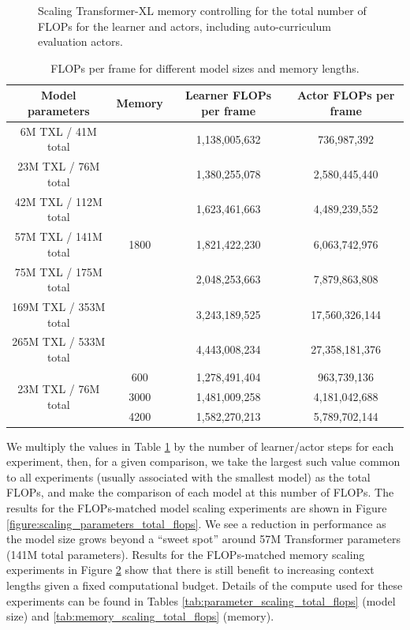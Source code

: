 \documentclass[11pt, a4paper, logo, copyright]{deepmind}
\begin{document}
\begin{appendix}
\begin{figure}[t!]
\begin{subfigure}[b]{0.49\textwidth}
        \vskip -3pt \caption{}
    \label{figure:scaling_memory_total_flops_20th}
    \end{subfigure}
    \caption{
        Scaling Transformer-XL memory controlling for the total number of FLOPs for the learner and actors, including auto-curriculum evaluation actors.
    \label{figure:scaling_memory_total_flops}
    }
\end{figure}
\begin{table}[t!]
  \begin{center}
    \caption{FLOPs per frame for different model sizes and memory lengths.}
    \begin{tabular}{c|c|c|c}
    \label{tab:flops}
      Model parameters & Memory & Learner FLOPs per frame & Actor FLOPs per frame \\
      \hline
      6M TXL / 41M total & \multirow{7}{*}{1800} & 1,138,005,632 & 736,987,392\\
      23M TXL / 76M total & & 1,380,255,078 & 2,580,445,440\\
      42M TXL / 112M total & & 1,623,461,663 & 4,489,239,552\\
      57M TXL / 141M total & & 1,821,422,230 & 6,063,742,976\\
      75M TXL / 175M total & & 2,048,253,663 & 7,879,863,808\\
      169M TXL / 353M total & & 3,243,189,525 & 17,560,326,144\\
      265M TXL / 533M total & & 4,443,008,234 & 27,358,181,376\\
      \multirow{3}{*}{23M TXL / 76M total } & 600 & 1,278,491,404 & 963,739,136\\
      & 3000 & 1,481,009,258 & 4,181,042,688\\
      & 4200 & 1,582,270,213 & 5,789,702,144\\
    \end{tabular}
  \end{center}
\end{table}
We multiply the values in Table \ref{tab:flops} by the number of learner/actor steps for each experiment, then,
for a given comparison, we take the largest such value common to all experiments (usually associated with the smallest model) as the total FLOPs, and make the comparison of each model at this number of FLOPs. The results for the FLOPs-matched model scaling experiments are shown in Figure \ref{figure:scaling_parameters_total_flops}. We see a reduction in performance as the model size grows beyond a ``sweet spot'' around 57M Transformer parameters (141M total parameters). Results for the FLOPs-matched memory scaling experiments in Figure \ref{figure:scaling_memory_total_flops} show that there is still benefit to increasing context lengths given a fixed computational budget. Details of the compute used for these experiments can be found in Tables \ref{tab:parameter_scaling_total_flops} (model size) and \ref{tab:memory_scaling_total_flops} (memory).

\end{appendix}
\end{document}
